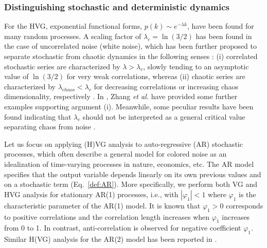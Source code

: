 		\subsubsection{Distinguishing stochastic and deterministic dynamics}
		For the HVG, exponential functional forms, $p(k) \sim e ^{-\lambda k}$, have been found for many random processes. A scaling factor of $\lambda_c = \ln (3/2)$ has been found in the case of uncorrelated noise (white noise), which has been further proposed to separate stochastic from chaotic dynamics in the following senses \cite{Lacasa2010,Lacasa2014b,Ravetti2014}: (i) correlated stochastic series are characterized by $\lambda > \lambda_c$, slowly tending to an asymptotic value of $\ln (3/2)$ for very weak correlations, whereas (ii) chaotic series are characterized by $\lambda_{chaos} < \lambda_c$ for decreasing correlations or increasing chaos dimensionality, respectively \cite{Lacasa2010}. In \cite{Zhang2017}, Zhang {\textit{et al.}} have provided some further examples supporting argument (i). Meanwhile, some peculiar results have been found indicating that $\lambda_c$ should not be interpreted as a general critical value separating chaos from noise \cite{Ravetti2014}. 
		
		Let us focus on applying (H)VG analysis to auto-regressive (AR) stochastic processes, which often describe a general model for colored noise as an idealization of time-varying processes in nature, economics, etc. The AR model specifies that the output variable depends linearly on its own previous values and on a stochastic term (Eq.~\ref{def:AR}). More specifically, we perform both VG and HVG analysis for stationary AR(1) processes, i.e., with $|\varphi_1| < 1$ where $\varphi_1$ is the characteristic parameter of the AR(1) model. It is known that $\varphi_1 > 0$ corresponds to positive correlations and the correlation length increases when $\varphi_1$ increases from 0 to 1. In contrast, anti-correlation is observed for negative coefficient $\varphi_1$. Similar H(VG) analysis for the AR(2) model has been reported in \cite{Zhang2017}. 

